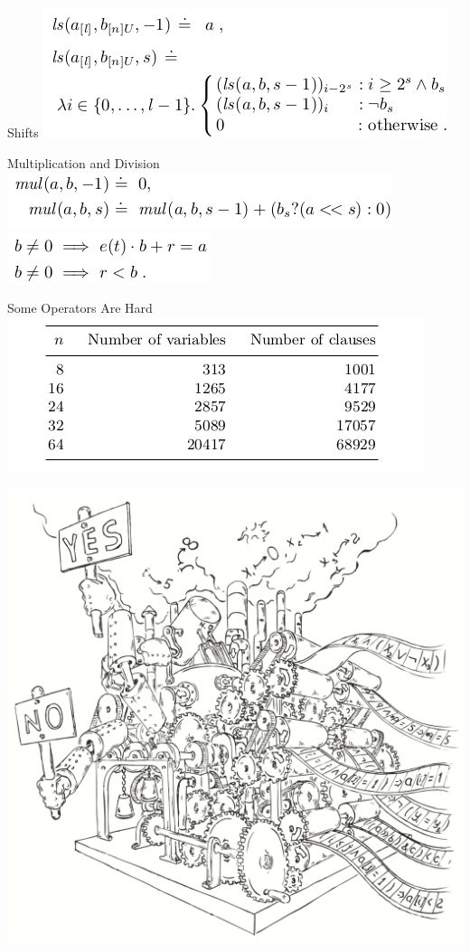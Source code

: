 \documentclass{beamer}
\begin{document}
\begin{frame}{Shifts}
\includegraphics[scale=0.5]{ls.png}\newline
\end{frame}

\begin{frame}{Multiplication and Division}
\includegraphics[scale=0.5]{mul1.png}\newline
\includegraphics[scale=0.5]{div.png}\newline
\end{frame}

\begin{frame}{Some Operators Are Hard}
\includegraphics[scale=0.5]{Size.png}\newline
\end{frame}

\begin{frame}
\includegraphics[scale=0.5]{../decision-procedure.png}
\end{frame}
\end{document}
